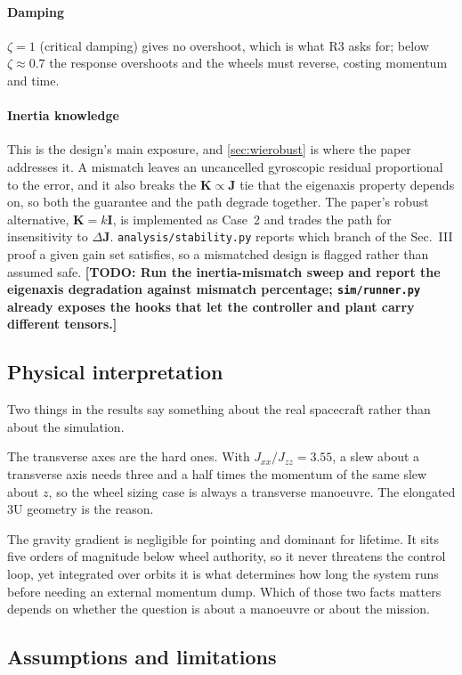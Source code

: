 \documentclass[conference,10pt,a4paper]{IEEEtran}
\newcommand{\TODO}[1]{\textbf{[TODO: #1]}}
\newcommand{\TODO}[1]{}
\newcommand{\mat}[1]{\bm{#1}}
\begin{document}
\paragraph{Damping} $\zeta=1$ (critical damping) gives no overshoot, which is
what R3 asks for; below $\zeta\approx0.7$ the response overshoots and the wheels
must reverse, costing momentum and time.

\paragraph{Inertia knowledge} This is the design's main exposure, and
\cref{sec:wierobust} is where the paper addresses it. A mismatch leaves an
uncancelled gyroscopic residual proportional to the error, and it also breaks
the $\mat{K}\propto\mat{J}$ tie that the eigenaxis property depends on, so both
the guarantee and the path degrade together. The paper's robust alternative,
$\mat{K}=k\mat{I}$, is implemented as Case~2 and trades the path for
insensitivity to $\Delta\mat{J}$. \texttt{analysis/stability.py}
reports which branch of the Sec.~III proof a given gain set satisfies, so a
mismatched design is flagged rather than assumed safe. \TODO{Run the
inertia-mismatch sweep and report the eigenaxis degradation against mismatch
percentage; \texttt{sim/runner.py} already exposes the hooks that let the
controller and plant carry different tensors.}

\subsection{Physical interpretation}

Two things in the results say something about the real spacecraft rather than
about the simulation.

The transverse axes are the hard ones. With $J_{xx}/J_{zz}=3.55$, a slew about
a transverse axis needs three and a half times the momentum of the same slew
about $z$, so the wheel sizing case is always a transverse manoeuvre. The
elongated 3U geometry is the reason.

The gravity gradient is negligible for pointing and dominant for lifetime. It
sits five orders of magnitude below wheel authority, so it never threatens the
control loop, yet integrated over orbits it is what determines how long the
system runs before needing an external momentum dump. Which of those two facts
matters depends on whether the question is about a manoeuvre or about the
mission.

\subsection{Assumptions and limitations}
\label{sec:limitations}
\end{document}
